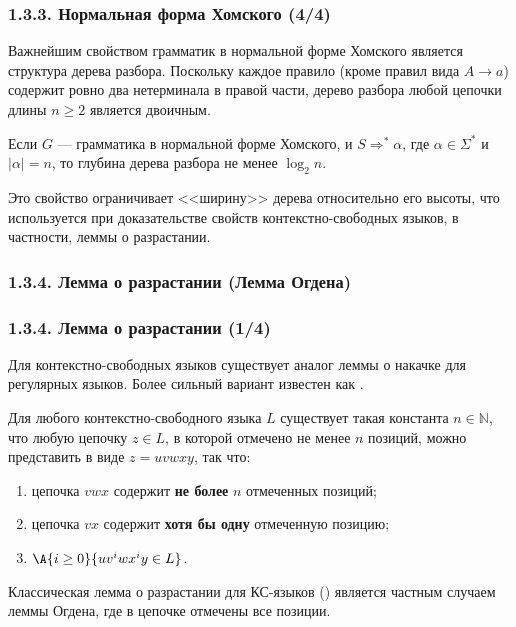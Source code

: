 \begin{frame}
\frametitle{1.3.3. Нормальная форма Хомского (4/4)}

\begin{remark}
Важнейшим свойством грамматик в нормальной форме Хомского является структура дерева разбора.
Поскольку каждое правило (кроме правил вида $A\to a$) содержит ровно два нетерминала в правой части, дерево разбора любой цепочки длины $n \ge 2$ является двоичным.
\end{remark}

\begin{corollary}
Если $G$ — грамматика в нормальной форме Хомского, и $S \Rightarrow^* \alpha$, где $\alpha \in \Sigma^*$ и $|\alpha|=n$, то глубина дерева разбора не менее $\log_2 n$.
\end{corollary}

Это свойство ограничивает <<ширину>> дерева относительно его высоты,
 что используется при доказательстве свойств контекстно-свободных языков, в частности, леммы о разрастании.
 
 \bigskip
\end{frame}

\subsubsection{1.3.4. Лемма о разрастании (Лемма Огдена)}\label{1.3.4.}
\begin{frame}
\frametitle{1.3.4. Лемма о разрастании (1/4)}

Для контекстно-свободных языков существует аналог леммы о накачке для регулярных языков. Более сильный вариант известен как .

\begin{theorem}
Для любого контекстно-свободного языка $L$ существует такая константа $n \in \mathbb{N}$, что любую цепочку $z \in L$, в которой отмечено не менее $n$ позиций, можно представить в виде $z = u v w x y$, так что:
\begin{enumerate}
    \item цепочка $vwx$ содержит \textbf{не более} $n$ отмеченных позиций;
    \item цепочка $vx$ содержит \textbf{хотя бы одну} отмеченную позицию;
    \item $\A{i \ge 0}{u v^i w x^i y \in L}$.
\end{enumerate}
\end{theorem}

\begin{remark}
Классическая лемма о разрастании для КС-языков () является частным случаем леммы Огдена, где в цепочке отмечены все позиции.
\end{remark}
\end{frame}

